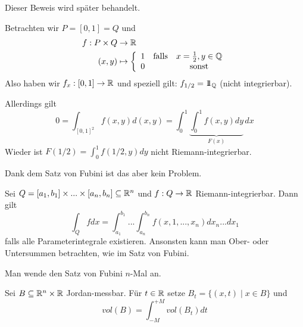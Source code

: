 \documentclass[main.tex]{subfiles}
\begin{document}
\begin{Beweis}
  Dieser Beweis wird später behandelt.
\end{Beweis}

\begin{Beispiel}
  Betrachten wir $P = [0,1] = Q$ und
  $$\begin{aligned}
    f: P \times Q & \to \mathbb{R} \\
    (x,y) & \mapsto \left\{\begin{array}{c c c}
      1 & \text{falls} & x = \frac{1}{2}, y\in \mathbb{Q} \\ 0 & & \text{sonst}
    \end{array}\right.
  \end{aligned}$$
  Also haben wir $f_x : [0,1] \to \mathbb{R}$ und speziell gilt: $f_{1/2} = 1\!\!1_{\mathbb{Q}}$ (nicht integrierbar).

  Allerdings gilt
  $$0 = \int_{[0,1]^2} f(x,y)d(x,y) = \int_0^1 \underbrace{\int_0^1 f(x,y) dy}_{F(x)} \, dx$$
  Wieder ist $F(1/2) = \int_0^1 f(1/2,y)dy$ nicht Riemann-integrierbar.

  Dank dem Satz von Fubini ist das aber kein Problem.
\end{Beispiel}

\begin{Korollar}
  Sei $Q = [a_1,b_1] \times ... \times [a_n,b_n] \subseteq \mathbb{R}^n$ und $f : Q \to \mathbb{R}$ Riemann-integrierbar. Dann gilt
  $$\int_Q fdx = \int_{a_1}^{b_1} ... \int_{a_n}^{b_n} f(x,1,...,x_n) dx_n ... dx_1$$
  falls alle Parameterintegrale existieren. Ansonsten kann man Ober- oder Untersummen betrachten, wie im Satz von Fubini.
\end{Korollar}

\begin{Beweis}
  Man wende den Satz von Fubini $n$-Mal an.
\end{Beweis}

\begin{Korollar}
  Sei $B \subseteq \mathbb{R}^n \times \mathbb{R}$ Jordan-messbar. Für $t \in \mathbb{R}$ setze $B_t = \{(x,t) \mid x \in B\}$ und
  $$vol(B) = \int_{-M}^{+M} vol(B_t) dt$$
\end{Korollar}
\end{document}
